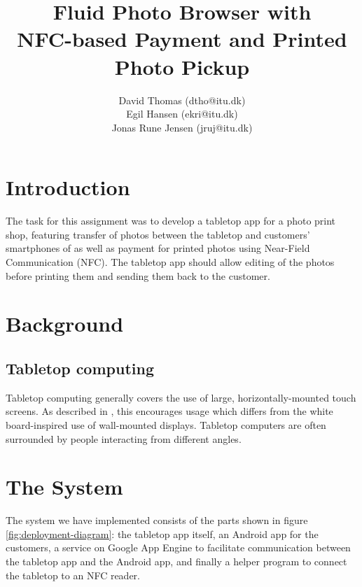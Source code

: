 \documentclass{article}
\begin{document}
 
\setlength{\paperheight}{11in}
\setlength{\paperwidth}{8.5in}
\setlength{\pdfpageheight}{\paperheight}
\setlength{\pdfpagewidth}{\paperwidth}
 
\title{Fluid Photo Browser with\\NFC-based Payment and Printed Photo Pickup}
\author{
  David Thomas (dtho@itu.dk)\\
  Egil Hansen (ekri@itu.dk)\\
                         	Jonas Rune Jensen (jruj@itu.dk)}
\maketitle
 
\section{Introduction}
The task for this assignment was to develop a tabletop app for a photo print shop, featuring transfer of photos between the tabletop and customers' smartphones of as well as payment for printed photos using Near-Field Communication (NFC). The tabletop app should allow editing of the photos before printing them and sending them back to the customer.
 
\section{Background}
 
\subsection{Tabletop computing}\label{tabletopTheory}
Tabletop computing generally covers the use of large, horizontally-mounted touch screens. As described in \cite{integratingTechnology}, this encourages usage which differs from the white board-inspired use of wall-mounted displays. Tabletop computers are often surrounded by people interacting from different angles.
 
\section{The System}
The system we have implemented consists of the parts shown in figure \ref{fig:deployment-diagram}: the tabletop app itself, an Android app for the customers, a service  on Google App Engine to facilitate communication between the tabletop app and the Android app, and finally a helper program to connect the tabletop to an NFC reader.
 
\end{document}
